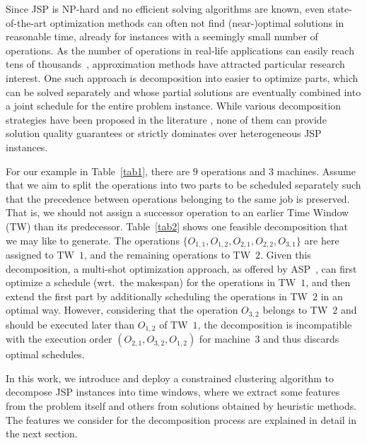 \documentclass[runningheads]{llncs}
\begin{document}
Since JSP is NP-hard \cite{garey1976complexity,SOTSKOV1995237}
and
no efficient solving algorithms are known, 
even state-of-the-art optimization methods can often not find (near-)optimal solutions in reasonable time, already for instances with a seemingly small number of operations.
As the number of operations in real-life applications
can easily reach tens of thousands~\cite{zhang2010hybrid},
approximation methods have attracted particular research interest.
One such approach is decomposition into easier to optimize parts,
which can be solved separately and whose partial solutions are
eventually combined into a joint schedule for the entire problem instance.
While various decomposition strategies have been proposed in the literature \cite{zhai2014decomposition,singer2001decomposition,ovacik2012decomposition,uzsoy2000performance},
none of them can provide solution quality guarantees
or strictly dominates over heterogeneous JSP instances. 

For our example in Table~\ref{tab1}, there are $9$ operations and $3$ machines.
Assume that we aim to split the operations into two parts to be scheduled separately such that the precedence between operations belonging to the same job is preserved.
That is, we should not assign a successor operation to an earlier Time Window (TW)
than its predecessor. %
Table~\ref{tab2} shows one feasible decomposition that we may like to generate.
The operations $\{ O_{1,1}, O_{1,2}, O_{2,1}, O_{2,2}, O_{3,1} \}$ are here assigned to TW~$1$, and the remaining operations to TW~$2$.
Given this decomposition, a multi-shot optimization approach,
as offered by ASP~\cite{gekakasc17a},
can first optimize a schedule (wrt.\ the makespan)
for the operations in TW~$1$, and then extend the first part by
additionally scheduling the operations in TW~$2$ in an optimal way.
However, considering that the operation $O_{3,2}$ belongs to TW~$2$
and should be executed later than $O_{1,2}$ of TW~$1$,
the decomposition is incompatible with the execution order
$(O_{2,1}, O_{3,2}, O_{1,2})$ for machine~$3$ and thus discards optimal schedules.

In this work, we introduce and deploy a constrained clustering algorithm to decompose  JSP instances into time windows, where we extract some features from the problem itself and others from solutions obtained by heuristic methods. The features we consider for the decomposition process are explained in detail in the next section.
\end{document}
